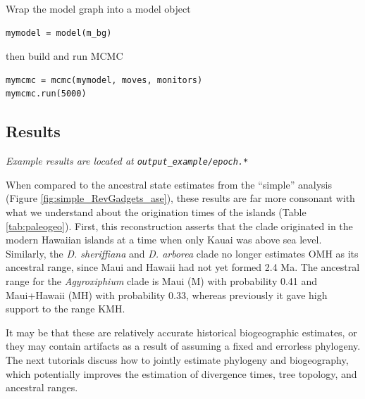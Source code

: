 Wrap the model graph into a model object

\begin{snugshade}
\begin{lstlisting}
mymodel = model(m_bg)
\end{lstlisting}
\end{snugshade}

then build and run MCMC

\begin{snugshade}
\begin{lstlisting}
mymcmc = mcmc(mymodel, moves, monitors)
mymcmc.run(5000)
\end{lstlisting}
\end{snugshade}

\subsection{Results}

\begin{center}
{\it Example results are located at {\tt output\_example/epoch.*}}
\end{center}

When compared to the ancestral state estimates from the ``simple'' analysis (Figure \ref{fig:simple_RevGadgets_ase}), these results are far more consonant with what we understand about the origination times of the islands (Table \ref{tab:paleogeo}).
First, this reconstruction asserts that the clade originated in the modern Hawaiian islands at a time when only Kauai was above sea level.
Similarly, the {\it D. sheriffiana} and {\it D. arborea} clade no longer estimates OMH as its ancestral range, since Maui and Hawaii had not yet formed 2.4 Ma.
The ancestral range for the {\it Agyroxiphium} clade is Maui (M) with probability 0.41 and Maui+Hawaii (MH) with probability 0.33, whereas previously it gave high support to the range KMH.

It may be that these are relatively accurate historical biogeographic estimates, or they may contain artifacts as a result of assuming a fixed and errorless phylogeny.
The next tutorials discuss how to jointly estimate phylogeny and biogeography, which potentially improves the estimation of divergence times, tree topology, and ancestral ranges.


